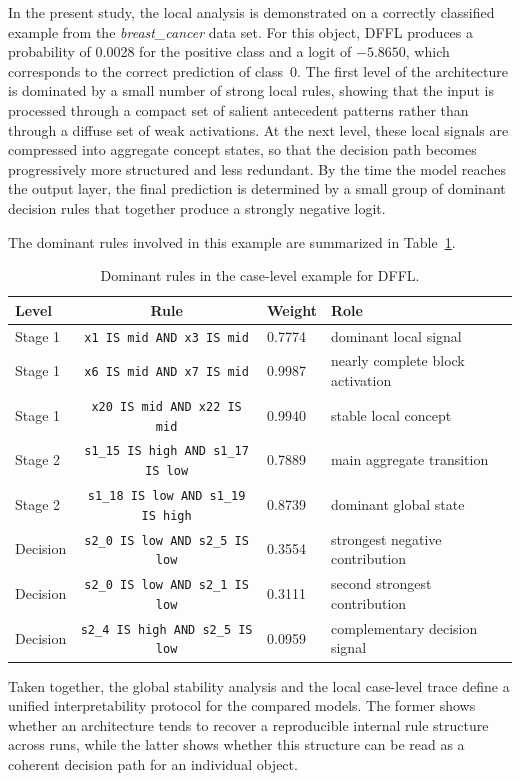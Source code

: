 \documentclass[runningheads]{llncs}
\begin{document}
In the present study, the local analysis is demonstrated on a correctly classified example from the \textit{breast\_cancer} data set. For this object, DFFL produces a probability of 0.0028 for the positive class and a logit of $-5.8650$, which corresponds to the correct prediction of class~0. The first level of the architecture is dominated by a small number of strong local rules, showing that the input is processed through a compact set of salient antecedent patterns rather than through a diffuse set of weak activations. At the next level, these local signals are compressed into aggregate concept states, so that the decision path becomes progressively more structured and less redundant. By the time the model reaches the output layer, the final prediction is determined by a small group of dominant decision rules that together produce a strongly negative logit.

The dominant rules involved in this example are summarized in Table~\ref{tab:case_rules}.

\begin{table}[H]
\centering
\caption{Dominant rules in the case-level example for DFFL.}
\label{tab:case_rules}
\small
\setlength{\tabcolsep}{4pt}
\begin{tabular}{lcll}
\toprule
Level & Rule & Weight & Role \\
\midrule
Stage 1 & \texttt{x1 IS mid AND x3 IS mid} & 0.7774 & dominant local signal \\
Stage 1 & \texttt{x6 IS mid AND x7 IS mid} & 0.9987 & nearly complete block activation \\
Stage 1 & \texttt{x20 IS mid AND x22 IS mid} & 0.9940 & stable local concept \\
Stage 2 & \texttt{s1\_15 IS high AND s1\_17 IS low} & 0.7889 & main aggregate transition \\
Stage 2 & \texttt{s1\_18 IS low AND s1\_19 IS high} & 0.8739 & dominant global state \\
Decision & \texttt{s2\_0 IS low AND s2\_5 IS low} & 0.3554 & strongest negative contribution \\
Decision & \texttt{s2\_0 IS low AND s2\_1 IS low} & 0.3111 & second strongest contribution \\
Decision & \texttt{s2\_4 IS high AND s2\_5 IS low} & 0.0959 & complementary decision signal \\
\bottomrule
\end{tabular}
\end{table}

Taken together, the global stability analysis and the local case-level trace define a unified interpretability protocol for the compared models. The former shows whether an architecture tends to recover a reproducible internal rule structure across runs, while the latter shows whether this structure can be read as a coherent decision path for an individual object.
\end{document}
